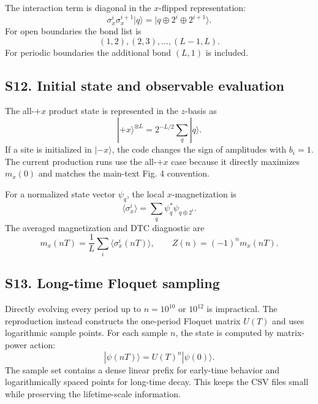 \documentclass[aps,pra,preprint,superscriptaddress,nofootinbib]{revtex4-2}
\begin{document}
The interaction term is diagonal in the \(x\)-flipped representation:
\begin{equation}
\sigma_x^i\sigma_x^{i+1}|q\rangle
=|q\oplus2^i\oplus2^{i+1}\rangle.
\end{equation}
For open boundaries the bond list is
\begin{equation}
(1,2),(2,3),\ldots,(L-1,L).
\end{equation}
For periodic boundaries the additional bond \((L,1)\) is included.

\subsection*{S12. Initial state and observable evaluation}

The all-\(+x\) product state is represented in the \(z\)-basis as
\begin{equation}
|+x\rangle^{\otimes L}
=2^{-L/2}\sum_q |q\rangle.
\end{equation}
If a site is initialized in \(|-x\rangle\), the code changes the sign of amplitudes with \(b_i=1\). The current production runs use the all-\(+x\) case because it directly maximizes \(m_x(0)\) and matches the main-text Fig. 4 convention.

For a normalized state vector \(\psi_q\), the local \(x\)-magnetization is
\begin{equation}
\langle\sigma_x^i\rangle
=\sum_q \psi_q^*\psi_{q\oplus2^i}.
\end{equation}
The averaged magnetization and DTC diagnostic are
\begin{equation}
m_x(nT)=\frac{1}{L}\sum_i\langle\sigma_x^i(nT)\rangle,
\qquad
Z(n)=(-1)^n m_x(nT).
\end{equation}

\subsection*{S13. Long-time Floquet sampling}

Directly evolving every period up to \(n=10^{10}\) or \(10^{12}\) is impractical. The reproduction instead constructs the one-period Floquet matrix \(U(T)\) and uses logarithmic sample points. For each sample \(n\), the state is computed by matrix-power action:
\begin{equation}
|\psi(nT)\rangle=U(T)^n|\psi(0)\rangle.
\end{equation}
The sample set contains a dense linear prefix for early-time behavior and logarithmically spaced points for long-time decay. This keeps the CSV files small while preserving the lifetime-scale information.
\end{document}
